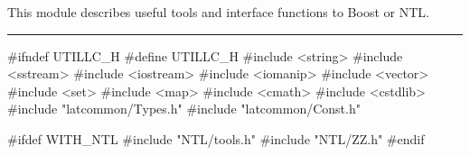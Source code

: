 % 
% 
% 
% 


This module describes useful tools and interface functions to Boost or NTL.

\bigskip\hrule
\code\hide
#ifndef UTILLC_H
#define UTILLC_H
\endhide
#include <string>
#include <sstream>
#include <iostream>
#include <iomanip>
#include <vector>
#include <set>
#include <map>
#include <cmath>
#include <cstdlib>
#include "latcommon/Types.h"
#include "latcommon/Const.h"

#ifdef WITH_NTL
#include "NTL/tools.h"
#include "NTL/ZZ.h"
#endif


